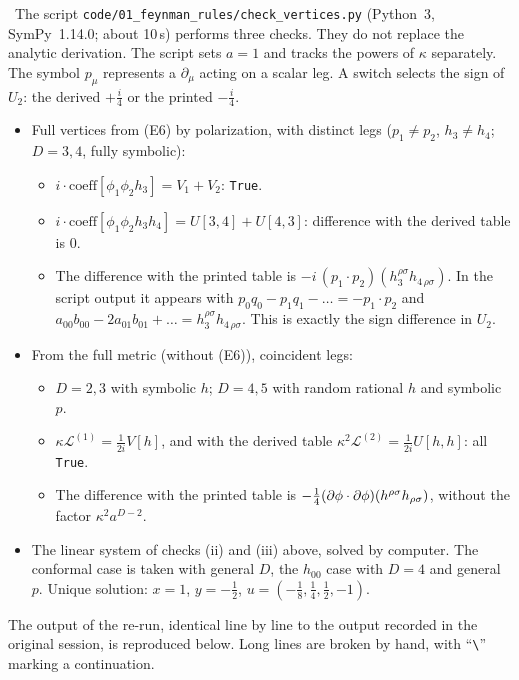\tC\ The script \texttt{code/01\_feynman\_rules/check\_vertices.py} (Python~3,
SymPy~1.14.0; about 10\,s) performs three checks. They do not replace the
analytic derivation. The script sets $a=1$ and tracks the powers of $\kappa$
separately. The symbol $p_\mu$ represents a $\partial_\mu$ acting on a scalar
leg. A switch selects the sign of $U_2$: the derived $+\tfrac i4$ or the printed
$-\tfrac i4$.
\begin{itemize}[leftmargin=1.4em]
\item[(A)] Full vertices from (E6) by polarization, with distinct legs
($p_1\neq p_2$, $h_3\neq h_4$; $D=3,4$, fully symbolic):
\begin{itemize}[leftmargin=1.2em]
\item $i\cdot\text{coeff}[\phi_1\phi_2h_3]=V_1+V_2$: \texttt{True}.
\item $i\cdot\text{coeff}[\phi_1\phi_2h_3h_4]=U[3,4]+U[4,3]$: difference with the
derived table is $0$.
\item The difference with the printed table is
$-i\,(p_1\!\cdot p_2)(h_3^{\rho\sigma}h_{4\,\rho\sigma})$. In the script output
it appears with $p_0q_0-p_1q_1-\ldots=-p_1\!\cdot p_2$ and
$a_{00}b_{00}-2a_{01}b_{01}+\ldots=h_3^{\rho\sigma}h_{4\,\rho\sigma}$. This is
exactly the sign difference in $U_2$.
\end{itemize}
\item[(B)] From the full metric (without (E6)), coincident legs:
\begin{itemize}[leftmargin=1.2em]
\item $D=2,3$ with symbolic $h$; $D=4,5$ with random rational $h$ and symbolic $p$.
\item $\kappa\mathcal L^{(1)}=\tfrac1{2i}V[h]$, and with the derived table
$\kappa^2\mathcal L^{(2)}=\tfrac1{2i}U[h,h]$: all \texttt{True}.
\item The difference with the printed table is
$-\tfrac14(\partial\phi\cdot\partial\phi)(h^{\rho\sigma}h_{\rho\sigma})$, without the factor $\kappa^2a^{D-2}$.
\end{itemize}
\item[(C)] The linear system of checks (ii) and (iii) above, solved by computer.
The conformal case is taken with general $D$, the $h_{00}$ case with $D=4$ and
general $p$. Unique solution: $x=1$, $y=-\tfrac12$, $u=(-\tfrac18,\tfrac14,\tfrac12,-1)$.
\end{itemize}
The output of the re-run, identical line by line to the output recorded in the
original session, is reproduced below. Long lines are broken by hand, with
``\texttt{\textbackslash}'' marking a continuation.

